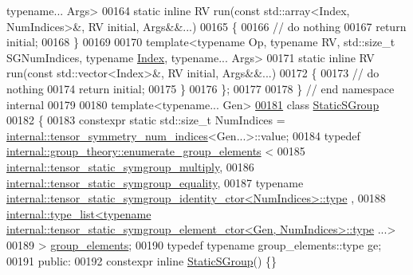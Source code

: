 \begin{DoxyCode}
       \textcolor{keyword}{typename}... Args>
00164   \textcolor{keyword}{static} \textcolor{keyword}{inline} RV run(\textcolor{keyword}{const} std::array<Index, NumIndices>&, RV initial, Args&&...)
00165   \{
00166     \textcolor{comment}{// do nothing}
00167     \textcolor{keywordflow}{return} initial;
00168   \}
00169 
00170   \textcolor{keyword}{template}<\textcolor{keyword}{typename} Op, \textcolor{keyword}{typename} RV, std::size\_t SGNumIndices, \textcolor{keyword}{typename} \hyperlink{namespace_eigen_a62e77e0933482dafde8fe197d9a2cfde}{Index}, \textcolor{keyword}{typename}... Args>
00171   \textcolor{keyword}{static} \textcolor{keyword}{inline} RV run(\textcolor{keyword}{const} std::vector<Index>&, RV initial, Args&&...)
00172   \{
00173     \textcolor{comment}{// do nothing}
00174     \textcolor{keywordflow}{return} initial;
00175   \}
00176 \};
00177 
00178 \} \textcolor{comment}{// end namespace internal}
00179 
00180 \textcolor{keyword}{template}<\textcolor{keyword}{typename}... Gen>
\hyperlink{class_eigen_1_1_static_s_group}{00181} \textcolor{keyword}{class }\hyperlink{class_eigen_1_1_static_s_group}{StaticSGroup}
00182 \{
00183     constexpr \textcolor{keyword}{static} std::size\_t NumIndices = 
      \hyperlink{struct_eigen_1_1internal_1_1tensor__symmetry__num__indices}{internal::tensor\_symmetry\_num\_indices}<Gen...>::value;
00184     \textcolor{keyword}{typedef} \hyperlink{struct_eigen_1_1internal_1_1group__theory_1_1enumerate__group__elements}{internal::group\_theory::enumerate\_group\_elements}
      <
00185       \hyperlink{struct_eigen_1_1internal_1_1tensor__static__symgroup__multiply}{internal::tensor\_static\_symgroup\_multiply},
00186       \hyperlink{struct_eigen_1_1internal_1_1tensor__static__symgroup__equality}{internal::tensor\_static\_symgroup\_equality},
00187       \textcolor{keyword}{typename} \hyperlink{struct_eigen_1_1internal_1_1tensor__static__symgroup__element}{internal::tensor\_static\_symgroup\_identity\_ctor<NumIndices>::type}
      ,
00188       
      \hyperlink{struct_eigen_1_1internal_1_1type__list}{internal::type\_list<typename internal::tensor\_static\_symgroup\_element\_ctor<Gen, NumIndices>::type}
      ...>
00189     > \hyperlink{struct_eigen_1_1internal_1_1group__theory_1_1enumerate__group__elements}{group\_elements};
00190     \textcolor{keyword}{typedef} \textcolor{keyword}{typename} group\_elements::type ge;
00191   \textcolor{keyword}{public}:
00192     constexpr \textcolor{keyword}{inline} \hyperlink{class_eigen_1_1_static_s_group}{StaticSGroup}() \{\}

\end{DoxyCode}
